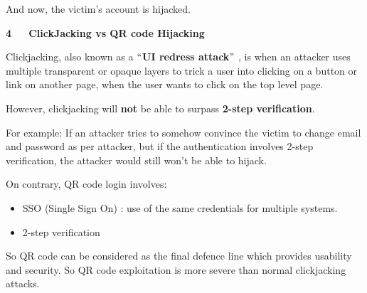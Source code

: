 \documentclass[12pt]{article}
\renewcommand{\_}{\kern-1.5pt\textunderscore\kern-1.5pt}
\begin{document}
\begin{adjustwidth}{0.0in}{-0.19in}
And now, the victim’s account is hijacked.\par

\end{adjustwidth}


\vspace{\baselineskip}
\begin{FlushLeft}
{\fontsize{18pt}{21.6pt}\selectfont \textbf{4\ \ \  ClickJacking vs QR code Hijacking}\par}
\end{FlushLeft}\par

\begin{FlushLeft}
Clickjacking, also known as a $``$\textbf{UI redress attack}$"$ , is when an attacker uses multiple transparent or opaque layers to trick a user into clicking on a button or link on another page, when the user wants to click on the top level page.
\end{FlushLeft}\par

\begin{FlushLeft}
However, clickjacking will \textbf{not} be able to surpass \textbf{2-step verification}.
\end{FlushLeft}\par

\begin{FlushLeft}
For example: If an attacker tries to somehow convince the victim to change email and password as per attacker, but if the authentication involves 2-step verification, the attacker would still won’t be able to hijack.
\end{FlushLeft}\par

\begin{FlushLeft}
On contrary, QR code login involves:
\end{FlushLeft}\par

\begin{itemize}
	\item SSO (Single Sign On) : use of the same credentials for multiple systems.\par

	\item 2-step verification
\end{itemize}\par

\begin{FlushLeft}
So QR code can be considered as the final defence line which provides usability and security. So QR code exploitation is more severe than normal clickjacking attacks.
\end{FlushLeft}\par
\end{document}
